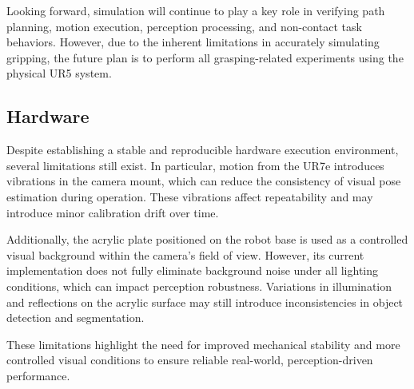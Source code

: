 \documentclass[12pt]{extarticle}
\begin{document}
Looking forward, simulation will continue to play a key role in verifying path planning, motion execution, perception processing, and non-contact task behaviors. However, due to the inherent limitations in accurately simulating gripping, the future plan is to perform all grasping-related experiments using the physical UR5 system. 

\subsection{Hardware}

Despite establishing a stable and reproducible hardware execution environment, several limitations still exist. In particular, motion from the UR7e introduces vibrations in the camera mount, which can reduce the consistency of visual pose estimation during operation. These vibrations affect repeatability and may introduce minor calibration drift over time.

Additionally, the acrylic plate positioned on the robot base is used as a controlled visual background within the camera's field of view. However, its current implementation does not fully eliminate background noise under all lighting conditions, which can impact perception robustness. Variations in illumination and reflections on the acrylic surface may still introduce inconsistencies in object detection and segmentation.

These limitations highlight the need for improved mechanical stability and more controlled visual conditions to ensure reliable real-world, perception-driven performance.

\newpage


\end{document}
